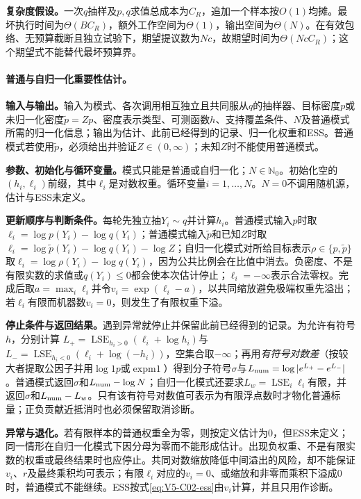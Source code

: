\textbf{复杂度假设。}一次$q$抽样及$p,q$求值总成本为$C_R$，追加一个样本按$O(1)$均摊。最坏执行时间为$\Theta(B C_R)$，额外工作空间为$\Theta(1)$，输出空间为$\Theta(N)$。在有效包络、无预算截断且独立试验下，期望提议数为$Nc$，故期望时间为$\Theta(Nc C_R)$；这个期望式不能替代最坏预算界。

\paragraph{普通与自归一化重要性估计。}
\textbf{输入与输出。}输入为模式、各次调用相互独立且共同服从$q$的抽样器、目标密度$p$或未归一化密度$\widetilde p=Zp$、密度表示类型、可测函数$h$、支持覆盖条件、$N$及普通模式所需的归一化信息；输出为估计、此前已经得到的记录、归一化权重和ESS。普通模式若使用$\widetilde p$，必须给出并验证$Z\in(0,\infty)$；未知$Z$时不能使用普通模式。

\textbf{参数、初始化与循环变量。}模式只能是普通或自归一化；$N\in\mathbb N_0$。初始化空的$(h_i,\ell_i)$前缀，其中$\ell_i$是对数权重。循环变量$i=1,\ldots,N$。$N=0$不调用随机源，估计与ESS未定义。

\textbf{更新顺序与判断条件。}每轮先独立抽$Y_i\sim q$并计算$h_i$。普通模式输入$p$时取$\ell_i=\log p(Y_i)-\log q(Y_i)$；普通模式输入$\widetilde p$和已知$Z$时取$\ell_i=\log\widetilde p(Y_i)-\log q(Y_i)-\log Z$；自归一化模式对所给目标表示$\rho\in\{p,\widetilde p\}$取$\ell_i=\log\rho(Y_i)-\log q(Y_i)$，因为公共比例会在比值中消去。负密度、不是有限实数的求值或$q(Y_i)\le0$都会使本次估计停止；$\ell_i=-\infty$表示合法零权。完成后取$a=\max_i\ell_i$并令$v_i=\exp(\ell_i-a)$，以共同缩放避免极端权重先溢出；若$\ell_i$有限而机器数$v_i=0$，则发生了有限权重下溢。

\textbf{停止条件与返回结果。}遇到异常就停止并保留此前已经得到的记录。为允许有符号$h$，分别计算
$L_+=\operatorname{LSE}_{h_i>0}(\ell_i+\log h_i)$与
$L_-=\operatorname{LSE}_{h_i<0}(\ell_i+\log(-h_i))$，空集合取$-\infty$；再用\emph{有符号对数差}（按较大者提取公因子并用$\log1p$或$\operatorname{expm1}$）得到分子符号$\sigma$与$L_{\rm num}=\log|e^{L_+}-e^{L_-}|$。普通模式返回$\sigma$和$L_{\rm num}-\log N$；自归一化模式还要求$L_w=\operatorname{LSE}_i\ell_i$有限，并返回$\sigma$和$L_{\rm num}-L_w$。只有该有符号对数值可表示为有限浮点数时才物化普通标量；正负贡献近抵消时也必须保留取消诊断。

\textbf{异常与退化。}若有限样本的普通权重全为零，则按定义估计为$0$，但ESS未定义；同一情形在自归一化模式下因分母为零而不能形成估计。出现负权重、不是有限实数的权重或最终结果时也应停止。共同对数缩放降低中间溢出的风险，却不能保证$v_i$、$r$及最终乘积均可表示；有限$\ell_i$对应的$v_i=0$、或缩放和非零而乘积下溢成$0$时，普通模式不能继续。ESS按式\eqref{eq:V5-C02-ess}由$v_i$计算，并且只用作诊断。

